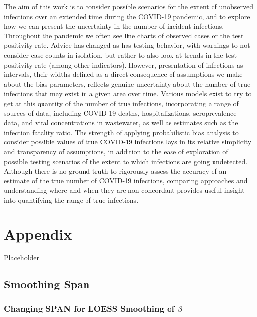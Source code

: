 \documentclass[12pt,twoside]{smiththesis}
\begin{document}
The aim of this work is to consider possible scenarios for the extent of unobserved infections over an extended time during the COVID-19 pandemic, and to explore how we can present the uncertainty in the number of incident infections. Throughout the pandemic we often see line charts of observed cases or the test positivity rate. Advice has changed as has testing behavior, with warnings to not consider case counts in isolation, but rather to also look at trends in the test positivity rate (among other indicators). However, presentation of infections as intervals, their widths defined as a direct consequence of assumptions we make about the bias parameters, reflects genuine uncertainty about the number of true infections that may exist in a given area over time.
Various models exist to try to get at this quantity of the number of true infections, incorporating a range of sources of data, including COVID-19 deaths, hospitalizations, seroprevalence data, and viral concentrations in wastewater, as well as estimates such as the infection fatality ratio.
The strength of applying probabilistic bias analysis to consider possible values of true COVID-19 infections lays in its relative simplicity and transparency of assumptions, in addition to the ease of exploration of possible testing scenarios of the extent to which infections are going undetected. Although there is no ground truth to rigorously assess the accuracy of an estimate of the true number of COVID-19 infections, comparing approaches and understanding where and when they are non concordant provides useful insight into quantifying the range of true infections.

\hypertarget{appendix}{%
\chapter{Appendix}\label{appendix}}

Placeholder

\hypertarget{smoothing-span}{%
\section{Smoothing Span}\label{smoothing-span}}

\hypertarget{changing-span-for-loess-smoothing-of-beta}{%
\subsection{\texorpdfstring{Changing SPAN for LOESS Smoothing of \(\beta\)}{Changing SPAN for LOESS Smoothing of \textbackslash beta}}\label{changing-span-for-loess-smoothing-of-beta}}
\end{document}
